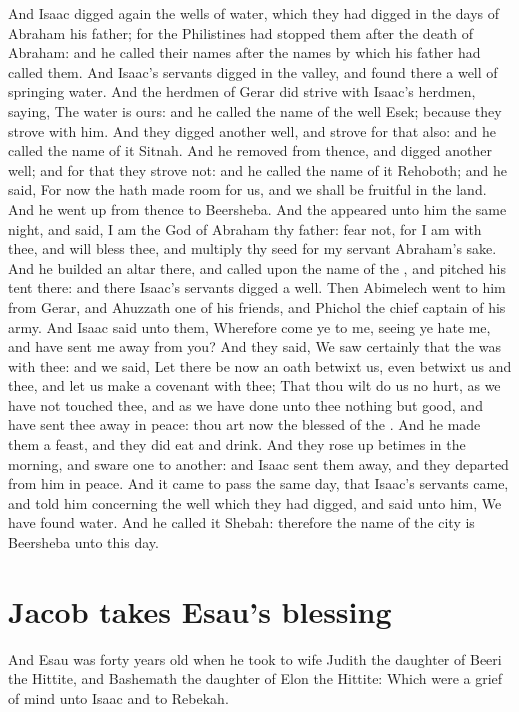 \begin{biblechapter}
\verse And Isaac digged again the wells of water, which they had digged in the days of Abraham his father; for the Philistines had stopped them after the death of Abraham: and he called their names after the names by which his father had called them.
\verse And Isaac's servants digged in the valley, and found there a well of springing water.
\verse And the herdmen of Gerar did strive with Isaac's herdmen, saying, The water is ours: and he called the name of the well Esek; because they strove with him.
\verse And they digged another well, and strove for that also: and he called the name of it Sitnah.
\verse And he removed from thence, and digged another well; and for that they strove not: and he called the name of it Rehoboth; and he said, For now the \LORD hath made room for us, and we shall be fruitful in the land.
\verse And he went up from thence to Beersheba.
\verse And the \LORD appeared unto him the same night, and said, I am the God of Abraham thy father: fear not, for I am with thee, and will bless thee, and multiply thy seed for my servant Abraham's sake.
\verse And he builded an altar there, and called upon the name of the \LORD, and pitched his tent there: and there Isaac's servants digged a well.
\verse Then Abimelech went to him from Gerar, and Ahuzzath one of his friends, and Phichol the chief captain of his army.
\verse And Isaac said unto them, Wherefore come ye to me, seeing ye hate me, and have sent me away from you?
\verse And they said, We saw certainly that the \LORD was with thee: and we said, Let there be now an oath betwixt us, even betwixt us and thee, and let us make a covenant with thee;
\verse That thou wilt do us no hurt, as we have not touched thee, and as we have done unto thee nothing but good, and have sent thee away in peace: thou art now the blessed of the \LORD.
\verse And he made them a feast, and they did eat and drink.
\verse And they rose up betimes in the morning, and sware one to another: and Isaac sent them away, and they departed from him in peace.
\verse And it came to pass the same day, that Isaac's servants came, and told him concerning the well which they had digged, and said unto him, We have found water.
\verse And he called it Shebah: therefore the name of the city is Beersheba unto this day.
\section*{Jacob takes Esau's blessing}
\verse And Esau was forty years old when he took to wife Judith the daughter of Beeri the Hittite, and Bashemath the daughter of Elon the Hittite:
\verse Which were a grief of mind unto Isaac and to Rebekah.
\end{biblechapter}

